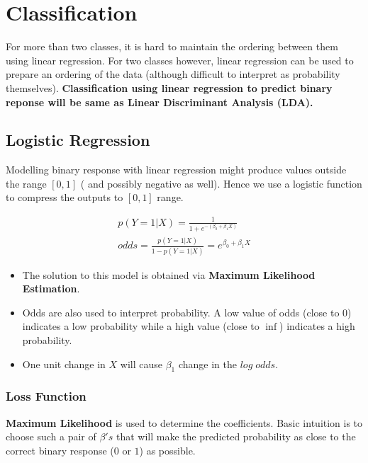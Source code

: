 \documentclass[11pt, a4paper]{article}
\begin{document}
    \section{Classification}
    For more than two classes, it is hard to maintain the ordering between them using linear regression. For two classes however, linear regression can be used to prepare an ordering of the data (although difficult to interpret as probability themselves).\newline 
    \textbf{Classification using linear regression to predict binary reponse will be same as Linear Discriminant Analysis (LDA).}\newline

    \subsection{Logistic Regression}
    Modelling binary response with linear regression might produce values outside the range $[0,1]$ ( and possibly negative as well). Hence we use a logistic function to compress the outputs to $[0,1]$ range.
    
    \begin{align*}
        p(Y=1|X) = \frac{1}{1+e^{-(\beta_{0}+\beta_{1}X)}}\\
        odds = \frac{p(Y=1|X)}{1-p(Y=1|X)} = e^{\beta_{0} + \beta_{1}X}
    \end{align*}
    \begin{itemize}
        \item The solution to this model is obtained via \textbf{Maximum Likelihood Estimation}.
        \item Odds are also used to interpret probability. A low value of odds (close to $0$) indicates a low probability while a high value (close to $\inf$) indicates a high probability.
        \item One unit change in $X$ will cause $\beta_{1}$ change in the $log\;odds$.
    \end{itemize}

    \subsubsection{Loss Function}
    \textbf{Maximum Likelihood} is used to determine the coefficients. Basic intuition is to choose such a pair of $\beta's$ that will make the predicted probability as close to the correct binary response ($0$ or $1$) as possible.
\end{document}
